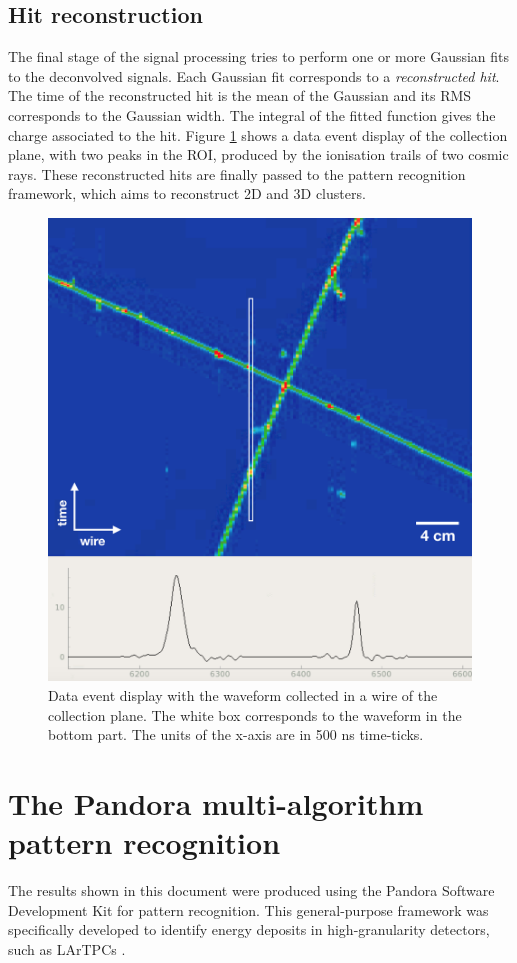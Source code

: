 \subsection{Hit reconstruction}
The final stage of the signal processing tries to perform one or more Gaussian fits to the deconvolved signals. Each Gaussian fit corresponds to a \emph{reconstructed hit}. The time of the reconstructed hit is the mean of the Gaussian and its RMS corresponds to the Gaussian width. The integral of the fitted function gives the charge associated to the hit. Figure \ref{fig:evd_wires} shows a data event display of the collection plane, with two peaks in the ROI, produced by the ionisation trails of two cosmic rays. 
These reconstructed hits are finally passed to the pattern recognition framework, which aims to reconstruct 2D and 3D clusters. 

\begin{figure}[htbp]
    \centering
    \includegraphics[width=0.75\linewidth]{figures/evd_wires.png}
    \caption{Data event display with the waveform collected in a wire of the collection plane. The white box corresponds to the waveform in the bottom part. The units of the x-axis are in 500 ns time-ticks.}
    \label{fig:evd_wires}
\end{figure}

\section{The Pandora multi-algorithm pattern recognition}
The results shown in this document were produced using the Pandora Software Development Kit for pattern recognition. This general-purpose framework was specifically developed to identify energy deposits in high-granularity detectors, such as LArTPCs \cite{Marshall:2015rfa}.

